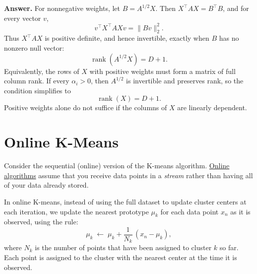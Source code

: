 \documentclass[11pt]{article}
\begin{document}
\begin{enumerate}[label=(\alph*)]
        \textbf{Answer.} For nonnegative weights, let
        $B=A^{1/2}X$. Then $X^\top AX=B^\top B$, and for every vector $v$,
        \[
            v^\top X^\top AXv=\|Bv\|_2^2.
        \]
        Thus $X^\top AX$ is positive definite, and hence invertible,
        exactly when $B$ has no nonzero null vector:
        \[
            \boxed{\operatorname{rank}(A^{1/2}X)=D+1.}
        \]
        Equivalently, the rows of $X$ with positive weights must form a
        matrix of full column rank. If every $\alpha_i>0$, then $A^{1/2}$
        is invertible and preserves rank, so the condition simplifies to
        \[
            \boxed{\operatorname{rank}(X)=D+1.}
        \]
        Positive weights alone do not suffice if the columns of $X$
        are linearly dependent.
    \end{enumerate}

\newpage



\section{Online K-Means}

Consider the sequential (online) version of the K-means algorithm. \hyperlink{https://en.wikipedia.org/wiki/Online_machine_learning}{Online algorithms} assume that you receive data points in a \textit{stream} rather than having all of your data already stored.
 
In online K-means, instead of using the full dataset to update cluster centers at each iteration, we update the nearest prototype \(\mu_k\) for each data point \(x_n\) as it is observed, using the rule:
    \[
    \mu_k \;\gets\; \mu_k + \frac{1}{N_k} \,(x_n - \mu_k),
    \]
where \(N_k\) is the number of points that have been assigned to cluster \(k\) so far. Each point is assigned to the cluster with the nearest center at the time it is observed.  
\end{document}

